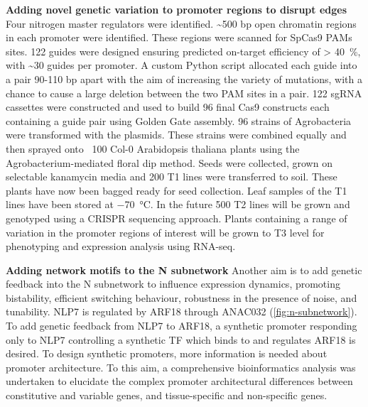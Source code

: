 \documentclass[../main.tex]{subfiles}
\begin{document}
\textbf{Adding novel genetic variation to promoter regions to disrupt edges}
Four nitrogen master regulators were identified. \textasciitilde{}500 bp open chromatin regions in each promoter were identified. These regions were scanned for SpCas9 PAMs sites. 122 guides were designed ensuring predicted on-target efficiency of \textgreater{} \SI{40}{\percent}, with \textasciitilde{}30 guides per promoter. A custom Python script allocated each guide into a pair 90-110 bp apart with the aim of increasing the variety of mutations, with a chance to cause a large deletion between the two PAM sites in a pair. 122 sgRNA cassettes were constructed and used to build 96 final Cas9 constructs each containing a guide pair using Golden Gate assembly. 96 strains of Agrobacteria were transformed with the plasmids. These strains were combined equally and then sprayed onto ~100 Col-0 Arabidopsis thaliana plants using the Agrobacterium-mediated floral dip method. Seeds were collected, grown on selectable kanamycin media and 200 T1 lines were transferred to soil. These plants have now been bagged ready for seed collection. Leaf samples of the T1 lines have been stored at \SI{-70}{\degreeCelsius}. In the future 500 T2 lines will be grown and genotyped using a CRISPR sequencing approach. Plants containing a range of variation in the promoter regions of interest will be grown to T3 level for phenotyping and expression analysis using RNA-seq.

\textbf{Adding network motifs to the N subnetwork}
Another aim is to add genetic feedback into the N subnetwork to influence expression dynamics, promoting bistability, efficient switching behaviour, robustness in the presence of noise, and tunability. NLP7 is regulated by ARF18 through ANAC032 (\autoref{fig:n-subnetwork}). To add genetic feedback from NLP7 to ARF18, a synthetic promoter responding only to NLP7 controlling a synthetic TF which binds to and regulates ARF18 is desired. To design synthetic promoters, more information is needed about promoter architecture. To this aim, a comprehensive bioinformatics analysis was undertaken to elucidate the complex promoter architectural differences between constitutive and variable genes, and tissue-specific and non-specific genes.
\end{document}
